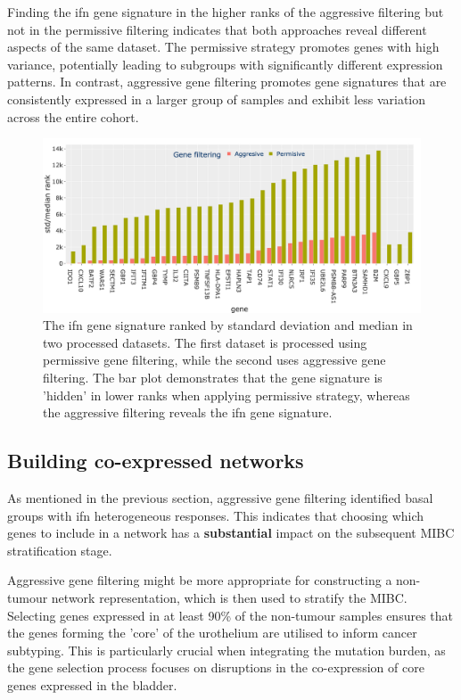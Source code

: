 Finding the \acrlong{ifn} gene signature in the higher ranks of the aggressive filtering but not in the permissive filtering indicates that both approaches reveal different aspects of the same dataset. The permissive strategy promotes genes with high variance, potentially leading to subgroups with significantly different expression patterns. In contrast, aggressive gene filtering promotes gene signatures that are consistently expressed in a larger group of samples and exhibit less variation across the entire cohort.


\begin{figure}[!htb]
    \centering
    \includegraphics[width=1.0\textwidth,keepaspectratio]{Sections/Gene_Sel/ifng_ranks.png}
    \caption[Std/median ranks of the genes in \acrlong{ifn} signature]{The \acrshort{ifn} gene signature \citep{Baker2022-bj} ranked by standard deviation and median in two processed datasets. The first dataset is processed using permissive gene filtering, while the second uses aggressive gene filtering. The bar plot demonstrates that the gene signature is 'hidden' in lower ranks when applying permissive strategy, whereas the aggressive filtering reveals the \acrshort{ifn} gene signature.}
      \label{fig:ifng_rank_genes}
\end{figure}

\subsection*{Building co-expressed networks}

As mentioned in the previous section, aggressive gene filtering identified basal groups with \acrshort{ifn} heterogeneous responses. This indicates that choosing which genes to include in a network has a \textbf{substantial} impact on the subsequent MIBC stratification stage.

Aggressive gene filtering might be more appropriate for constructing a non-tumour network representation, which is then used to stratify the MIBC. Selecting genes expressed in at least 90\% of the non-tumour samples ensures that the genes forming the 'core' of the urothelium are utilised to inform cancer subtyping. This is particularly crucial when integrating the mutation burden, as the gene selection process focuses on disruptions in the co-expression of core genes expressed in the bladder.

